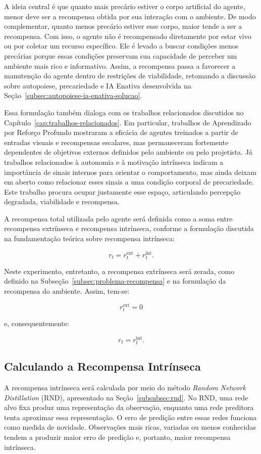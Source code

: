 A ideia central é que quanto mais precário estiver o corpo artificial do agente, menor deve ser a recompensa obtida por sua interação com o ambiente. De modo complementar, quanto menos precário estiver esse corpo, maior tende a ser a recompensa. Com isso, o agente não é recompensado diretamente por estar vivo ou por coletar um recurso específico. Ele é levado a buscar condições menos precárias porque essas condições preservam sua capacidade de perceber um ambiente mais rico e informativo. Assim, a recompensa passa a favorecer a manutenção do agente dentro de restrições de viabilidade, retomando a discussão sobre autopoiese, precariedade e IA Enativa desenvolvida na Seção~\ref{subsec:autopoiese-ia-enativa-solucao}.

Essa formulação também dialoga com os trabalhos relacionados discutidos no Capítulo~\ref{cap:trabalhos-relacionados}. Em particular, trabalhos de Aprendizado por Reforço Profundo mostraram a eficácia de agentes treinados a partir de entradas visuais e recompensas escalares, mas permaneceram fortemente dependentes de objetivos externos definidos pelo ambiente ou pelo projetista. Já trabalhos relacionados à autonomia e à motivação intrínseca indicam a importância de sinais internos para orientar o comportamento, mas ainda deixam em aberto como relacionar esses sinais a uma condição corporal de precariedade. Este trabalho procura ocupar justamente esse espaço, articulando percepção degradada, viabilidade e recompensa.

A recompensa total utilizada pelo agente será definida como a soma entre recompensa extrínseca e recompensa intrínseca, conforme a formulação discutida na fundamentação teórica sobre recompensa intrínseca:

$$
r_t = r_t^{\text{ext}} + r_t^{\text{int}}.
$$

Neste experimento, entretanto, a recompensa extrínseca será zerada, como definido na Subseção~\ref{subsec:problema-recompensa} e na formulação da recompensa do ambiente. Assim, tem-se:

$$
r_t^{\text{ext}} = 0
$$

\noindent e, consequentemente:

$$
r_t = r_t^{\text{int}}.
$$

\subsection{Calculando a Recompensa Intrínseca}

A recompensa intrínseca será calculada por meio do método \textit{Random Network Distillation} (RND), apresentado na Seção~\ref{subsubsec:rnd}. No RND, uma rede alvo fixa produz uma representação da observação, enquanto uma rede preditora tenta aproximar essa representação. O erro de predição entre essas redes funciona como medida de novidade. Observações mais ricas, variadas ou menos conhecidas tendem a produzir maior erro de predição e, portanto, maior recompensa intrínseca.

